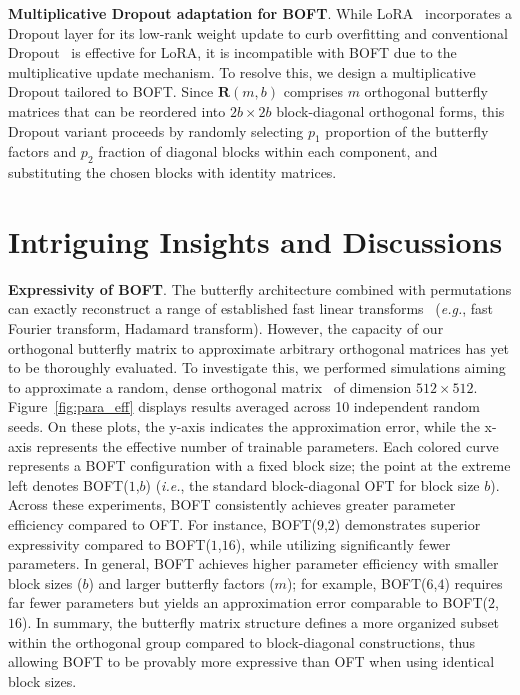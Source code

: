 \textbf{Multiplicative Dropout adaptation for BOFT}. While LoRA~\cite{hulora2022} incorporates a Dropout layer for its low-rank weight update to curb overfitting and conventional Dropout~\cite{srivastava2014dropout} is effective for LoRA, it is incompatible with BOFT due to the multiplicative update mechanism. To resolve this, we design a multiplicative Dropout tailored to BOFT. Since $\bm{R}(m, b)$ comprises $m$ orthogonal butterfly matrices that can be reordered into $2b\times 2b$ block-diagonal orthogonal forms, this Dropout variant proceeds by randomly selecting $p_1$ proportion of the butterfly factors and $p_2$ fraction of diagonal blocks within each component, and substituting the chosen blocks with identity matrices.

\section{Intriguing Insights and Discussions}

\textbf{Expressivity of BOFT}. The butterfly architecture combined with permutations can exactly reconstruct a range of established fast linear transforms~\cite{dao2019learning,dao2019kaleidoscope} (\emph{e.g.}, fast Fourier transform, Hadamard transform). However, the capacity of our orthogonal butterfly matrix to approximate arbitrary orthogonal matrices has yet to be thoroughly evaluated. To investigate this, we performed simulations aiming to approximate a random, dense orthogonal matrix~\cite{anderson1987generation} of dimension $512\times 512$. Figure~\ref{fig:para_eff} displays results averaged across 10 independent random seeds. On these plots, the y-axis indicates the approximation error, while the x-axis represents the effective number of trainable parameters. Each colored curve represents a BOFT configuration with a fixed block size; the point at the extreme left denotes BOFT($1$,$b$) (\emph{i.e.}, the standard block-diagonal OFT for block size $b$). Across these experiments, BOFT consistently achieves greater parameter efficiency compared to OFT. For instance, BOFT($9$,$2$) demonstrates superior expressivity compared to BOFT($1$,$16$), while utilizing significantly fewer parameters. In general, BOFT achieves higher parameter efficiency with smaller block sizes ($b$) and larger butterfly factors ($m$); for example, BOFT($6$,$4$) requires far fewer parameters but yields an approximation error comparable to BOFT($2$,$16$). In summary, the butterfly matrix structure defines a more organized subset within the orthogonal group compared to block-diagonal constructions, thus allowing BOFT to be provably more expressive than OFT when using identical block sizes.

